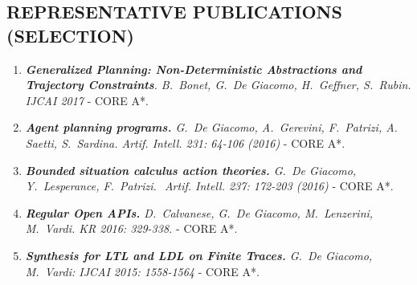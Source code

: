\vspace{-1ex}
\subsection*{REPRESENTATIVE PUBLICATIONS (SELECTION)}
\vspace{-1ex}

\begin{enumerate}[topsep=0pt,itemsep=-1ex,partopsep=1ex,parsep=1ex]


\item \textit{\textbf{Generalized Planning: Non-Deterministic Abstractions and Trajectory Constraints}. B.\ Bonet, G.\ De Giacomo, H.\ Geffner, S.\ Rubin. IJCAI 2017} - CORE  A*. %


\item \textit{\textbf{Agent planning programs.} G.\ De Giacomo, A.\ Gerevini, F.\ Patrizi, A.\, Saetti, S.\ Sardina. Artif. Intell. 231: 64-106 (2016)} - CORE  A*. %

 \item \textit{\textbf{Bounded situation calculus action theories.} G.\ De Giacomo, Y.\ Lesperance, F.\ Patrizi.  Artif. Intell. 237: 172-203 (2016)} - CORE  A*. %

\item \textit{\textbf{Regular Open APIs.}
D.\ Calvanese, G.\ De Giacomo, M.\ Lenzerini, M.\ Vardi. KR 2016: 329-338.}  - CORE  A*. %

\item \textit{\textbf{Synthesis for LTL and LDL on Finite Traces.} G.\ De Giacomo, M.\ Vardi: IJCAI 2015: 1558-1564} - CORE  A*. %




\end{enumerate}

